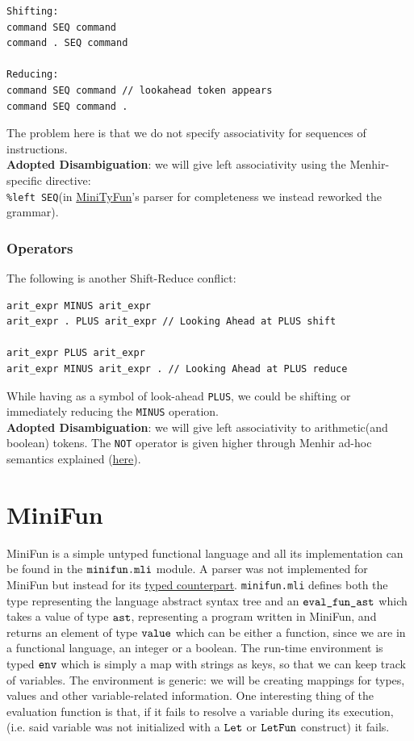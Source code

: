 \documentclass[a4paper,11pt]{report}
\begin{document}
	\begin{lstlisting}[caption={Conflict on the associativity of sequences}, captionpos=b]
Shifting:
command SEQ command 
command . SEQ command 

Reducing:
command SEQ command // lookahead token appears
command SEQ command .
	\end{lstlisting}
	
	The problem here is that we do not specify associativity for sequences of instructions.\\
	\textbf{Adopted Disambiguation}: we will give left associativity using the Menhir-specific directive:\\
	\verb|%left SEQ|(in \hyperref[Section::TyFun]{MiniTyFun}'s parser for completeness we instead reworked the grammar).
	
	\subsubsection {Operators}
	The following is another Shift-Reduce conflict: 
	
	\begin{lstlisting}[basicstyle=\small]
arit_expr MINUS arit_expr 
arit_expr . PLUS arit_expr // Looking Ahead at PLUS shift

arit_expr PLUS arit_expr
arit_expr MINUS arit_expr . // Looking Ahead at PLUS reduce
	\end{lstlisting}
	
	While having as a symbol of look-ahead \verb|PLUS|, we could be shifting
	or immediately reducing the \verb|MINUS| operation.\\
	\textbf{Adopted Disambiguation}: we will give left associativity to arithmetic(and boolean) tokens. The \verb|NOT| operator is given higher through Menhir ad-hoc semantics explained (\href{https://gallium.inria.fr/~fpottier/menhir/manual.pdf#subsubsection.4.1.4}{here}).


\section{MiniFun}
\label{Section::MiniFun}

MiniFun is a simple untyped functional language and all its implementation can be found in the $\verb|minifun.mli|$ module. A parser was not implemented for MiniFun but instead for its \hyperref[Section::TyFun]{typed counterpart}. \verb|minifun.mli| defines both the type representing the language abstract syntax tree and an $\verb|eval_fun_ast|$ which takes a value of type $\verb|ast|$, representing a program written in MiniFun, and returns an element of type $\verb|value|$ which can be either a function, since we are in a functional language, an integer or a boolean.
The run-time environment is typed $\verb|env|$ which is simply a map with strings as keys, so that we can keep track of variables. The environment is generic: we will be creating mappings for types, values and other variable-related information.
One interesting thing of the evaluation function is that, if it fails to resolve a variable during its execution, (i.e. said variable was not initialized with a $\verb|Let|$ or $\verb|LetFun|$ construct) it fails.
\end{document}
